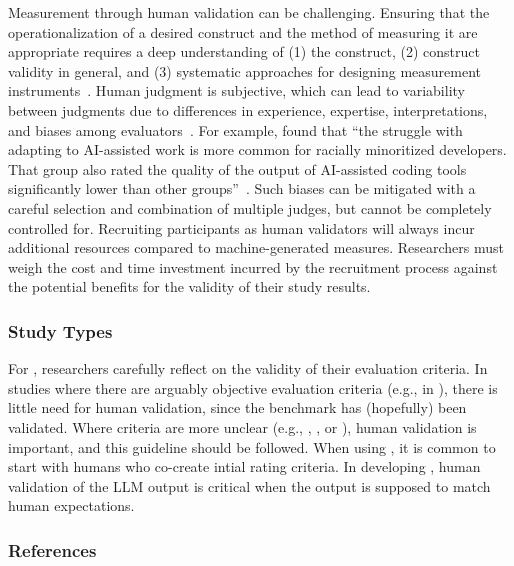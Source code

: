 Measurement through human validation can be challenging.
Ensuring that the operationalization of a desired construct and the method of measuring it are appropriate requires a deep understanding of (1) the construct, (2) construct validity in general, and (3) systematic approaches for designing measurement instruments~\cite{DBLP:journals/tse/SjobergB23}.
Human judgment is subjective, which can lead to variability between judgments due to differences in experience, expertise, interpretations, and biases among evaluators~\cite{DBLP:journals/pacmhci/McDonaldSF19}.
For example, \citeauthor{hicks_lee_foster-marks_2025} found that \enquote{the struggle with adapting to AI-assisted work is more common for racially minoritized developers.
That group also rated the quality of the output of AI-assisted coding tools significantly lower than other groups}~\cite{hicks_lee_foster-marks_2025}.
Such biases can be mitigated with a careful selection and combination of multiple judges, but cannot be completely controlled for.
Recruiting participants as human validators will always incur additional resources compared to machine-generated measures.
Researchers must weigh the cost and time investment incurred by the recruitment process against the potential benefits for the validity of their study results.

\subsubsection{Study Types}

For \llmusage, researchers \should carefully reflect on the validity of their evaluation criteria.
In studies where there are arguably objective evaluation criteria (e.g., in \benchmarkingtasks), there is little need for human validation, since the benchmark has (hopefully) been validated.
Where criteria are more unclear (e.g., \annotators, \subjects, or \synthesis), human validation is important, and this guideline should be followed.
When using \judges, it is common to start with humans who co-create intial rating criteria. 
In developing \newtools, human validation of the LLM output is critical when the output is supposed to match human expectations.

\subsubsection{References}





